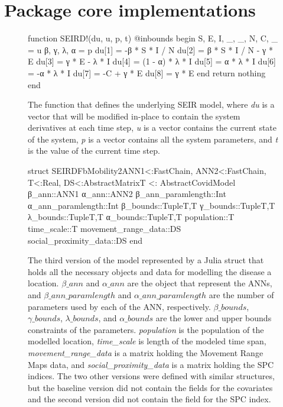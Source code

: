 \chapter{Package core implementations}

\begin{figure}[!htb]
\centering
\begin{jllisting}
function SEIRD!(du, u, p, t)
    @inbounds begin
        S, E, I, _, _, N, C, _ = u
        β, γ, λ, α = p
        du[1] = -β * S * I / N
        du[2] = β * S * I / N - γ * E
        du[3] = γ * E - λ * I
        du[4] = (1 - α) * λ * I
        du[5] = α * λ * I
        du[6] = -α * λ * I
        du[7] = -C + γ * E
        du[8] = γ * E
    end
    return nothing
end
\end{jllisting}
\caption{The function that defines the underlying SEIR model, where \textit{du} is a vector that will be modified in-place to contain the system derivatives at each time step, \textit{u} is a vector contains the current state of the system, \textit{p} is a vector contains all the system parameters, and \textit{t} is the value of the current time step.}
\label{fig:diffeq-seird-inplace}
\end{figure}

\begin{figure}[!htb]
\centering
\begin{jllisting}
struct SEIRDFbMobility2{ANN1<:FastChain,
                        ANN2<:FastChain,
                        T<:Real,
                        DS<:AbstractMatrix{T}} <: AbstractCovidModel
    β_ann::ANN1
    α_ann::ANN2
    β_ann_paramlength::Int
    α_ann_paramlength::Int
    β_bounds::Tuple{T,T}
    γ_bounds::Tuple{T,T}
    λ_bounds::Tuple{T,T}
    α_bounds::Tuple{T,T}
    population::T
    time_scale::T
    movement_range_data::DS
    social_proximity_data::DS
end
\end{jllisting}
\caption{The third version of the model represented by a Julia struct that holds all the necessary objects and data for modelling the disease a location. \textit{$\beta\_ann$} and \textit{$\alpha\_ann$} are the object that represent the \glspl{ANN}, and \textit{$\beta\_ann\_paramlength$} and \textit{$\alpha\_ann\_paramlength$} are the number of parameters used by each of the \gls{ANN}, respectively. \textit{$\beta\_bounds$}, \textit{$\gamma\_bounds$}, \textit{$\lambda\_bounds$}, and \textit{$\alpha\_bounds$} are the lower and upper bounds constraints of the parameters. \textit{population} is the population of the modelled location, \textit{time\_scale} is length of the modeled time span, \textit{movement\_range\_data} is a matrix holding the Movement Range Maps data, and \textit{social\_proximity\_data} is a matrix holding the \gls{SPC} indices. The two other versions were defined with similar structures, but the baseline version did not contain the fields for the covariates and the second version did not contain the field for the \gls{SPC} index.}
\label{fig:diffeq-seird-fb2-struct}
\end{figure}

